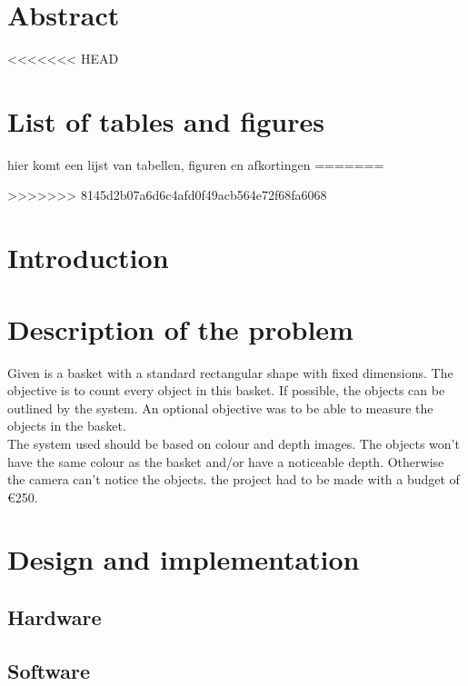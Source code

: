 \documentclass{article}
\begin{document}


\section*{Abstract}
\thispagestyle{empty}

\newpage
\tableofcontents
\thispagestyle{empty}

\newpage
\listoftables
\thispagestyle{empty}

<<<<<<< HEAD
\tableofcontents

\section{List of tables and figures}
hier komt een lijst van tabellen, figuren en afkortingen
=======
\newpage
\listoffigures
\thispagestyle{empty}
>>>>>>> 8145d2b07a6d6c4afd0f49acb564e72f68fa6068

\newpage
\section{Introduction}

\section{Description of the problem}

\noindent Given is a basket with a standard rectangular shape with fixed dimensions. The objective is to count every object in this basket. If possible, the objects can be outlined by the system. An optional objective was to be able to measure the objects in the basket.\\

\noindent The system used should be based on colour and depth images. The objects won't have the same colour as the basket and/or have a noticeable depth. Otherwise the camera can't notice the objects. the project had to be made with a budget of \euro 250.


\section{Design and implementation}
\subsection{Hardware}
\subsection{Software}
\end{document}
